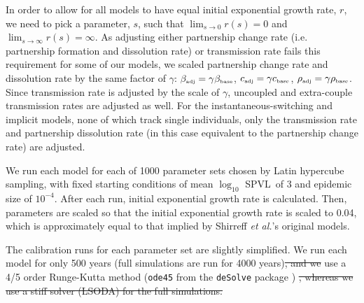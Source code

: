 \documentclass[10pt,letterpaper]{article}
\newcommand{\Lspvl}{$\log_{10}$ SPVL}
\newcommand{\etal}{\textit{et al.}}
\newcommand{\tsub}[2]{#1_{{\textrm{\tiny #2}}}}
\providecommand{\DIFaddtex}[1]{{\protect\color{blue}\uwave{#1}}} %
\providecommand{\DIFdeltex}[1]{{\protect\color{red}\sout{#1}}}                      %
\providecommand{\DIFaddbegin}{} %
\providecommand{\DIFaddend}{} %
\providecommand{\DIFdelbegin}{} %
\providecommand{\DIFdelend}{} %
\providecommand{\DIFadd}[1]{\texorpdfstring{\DIFaddtex{#1}}{#1}} %
\providecommand{\DIFdel}[1]{\texorpdfstring{\DIFdeltex{#1}}{}} %
\newcommand{\DIFscaledelfig}{0.5}
\newlength{\DIFdelgraphicswidth} %
\newlength{\DIFdelgraphicsheight} %
\newcommand{\DIFaddincludegraphics}[2][]{{\color{blue}\fbox{\DIFOincludegraphics[#1]{#2}}}} %
\newcommand{\DIFdelincludegraphics}[2][]{%
\sbox{\DIFdelgraphicsbox}{\DIFOincludegraphics[#1]{#2}}%
\settoboxwidth{\DIFdelgraphicswidth}{\DIFdelgraphicsbox} %
\settoboxtotalheight{\DIFdelgraphicsheight}{\DIFdelgraphicsbox} %
\scalebox{\DIFscaledelfig}{%
\parbox[b]{\DIFdelgraphicswidth}{\usebox{\DIFdelgraphicsbox}\\[-\baselineskip] \rule{\DIFdelgraphicswidth}{0em}}\llap{\resizebox{\DIFdelgraphicswidth}{\DIFdelgraphicsheight}{%
\setlength{\unitlength}{\DIFdelgraphicswidth}%
\begin{picture}(1,1)%
\thicklines\linethickness{2pt} %
{\color[rgb]{1,0,0}\put(0,0){\framebox(1,1){}}}%
{\color[rgb]{1,0,0}\put(0,0){\line( 1,1){1}}}%
{\color[rgb]{1,0,0}\put(0,1){\line(1,-1){1}}}%
\end{picture}%
}\hspace*{3pt}}} %
} %
\DeclareRobustCommand{\DIFaddbegin}{\DIFOaddbegin \let\includegraphics\DIFaddincludegraphics} %
\DeclareRobustCommand{\DIFaddend}{\DIFOaddend \let\includegraphics\DIFOincludegraphics} %
\DeclareRobustCommand{\DIFdelbegin}{\DIFOdelbegin \let\includegraphics\DIFdelincludegraphics} %
\DeclareRobustCommand{\DIFdelend}{\DIFOaddend \let\includegraphics\DIFOincludegraphics} %
\begin{document}
In order to allow for all models to have equal initial exponential
growth rate, $r$, we need to pick a parameter, $s$, such that
$\lim_{s\to 0} r(s) = 0$ and $\lim_{s\to\infty} r(s) = \infty$. As
adjusting either partnership change rate (i.e. partnership formation
and dissolution rate) or transmission rate fails this requirement for
some of our models, we scaled partnership change rate and
dissolution rate by the same factor of $\gamma$: $\tsub{\beta}{adj} =
\gamma \tsub{\beta}{base}$, $\tsub{c}{adj} = \gamma \tsub{c}{base}$,
$\tsub{\rho}{adj} = \gamma \tsub{\rho}{base}$. Since transmission rate
is adjusted by the scale of $\gamma$, uncoupled and extra-couple
transmission rates are adjusted as well. For the instantaneous-switching
and implicit models, none of which track single individuals, 
only the transmission rate and partnership
dissolution rate (in this case equivalent to the partnership change
rate) are adjusted.

We run each model for each of 1000 parameter sets chosen by Latin hypercube sampling, with fixed starting conditions
of mean \Lspvl\ of 3 and epidemic size of $10^{-4}$. After each run, initial exponential growth rate is calculated. Then, parameters are scaled so that the initial exponential growth rate is scaled to 0.04, which is approximately equal to that implied by Shirreff \etal's original models.

The calibration runs for each parameter set are slightly
simplified. We run each model for only 500 years
(full simulations are run for 4000 years)\DIFdelbegin \DIFdel{, and we }\DIFdelend \DIFaddbegin \DIFadd{. We }\DIFaddend use a 4/5 order 
Runge-Kutta method (\texttt{ode45} from the \texttt{deSolve} package
\cite{soetaert_solving_2010}) \DIFdelbegin \DIFdel{, whereas we use
a stiff solver (LSODA)
for the full simulations.
}\DIFdelend \DIFaddbegin \DIFadd{for all simulations.
}\DIFaddend 
\end{document}
